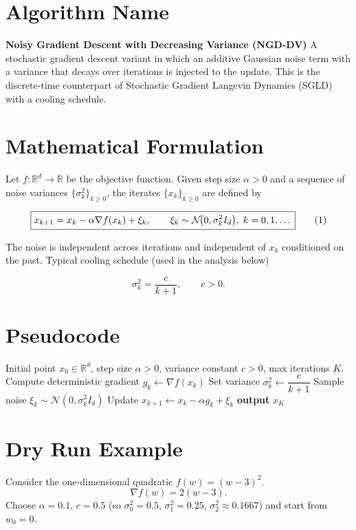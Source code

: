 \documentclass{article}
\begin{document}
\section*{Algorithm Name}
\textbf{Noisy Gradient Descent with Decreasing Variance (NGD-DV)}  
A stochastic gradient descent variant in which an additive Gaussian noise term with a variance that decays over iterations is injected to the update. This is the discrete‑time counterpart of Stochastic Gradient Langevin Dynamics (SGLD) with a cooling schedule.

\section*{Mathematical Formulation}
Let $f:\mathbb{R}^{d}\rightarrow\mathbb{R}$ be the objective function.  
Given step size $\alpha>0$ and a sequence of noise variances $\{\sigma_k^2\}_{k\ge 0}$, the iterates $\{x_k\}_{k\ge 0}$ are defined by  

\[
\boxed{%
x_{k+1}=x_k-\alpha \nabla f(x_k)+\xi_k,\qquad 
\xi_k\sim\mathcal{N}\!\bigl(0,\sigma_k^2 I_d\bigr),\;k=0,1,\dots
}
\tag{1}
\]

The noise is independent across iterations and independent of $x_k$ conditioned on the past.  
Typical cooling schedule (used in the analysis below)  

\[
\sigma_k^2 = \frac{c}{k+1},\qquad c>0.
\tag{2}
\]

\section*{Pseudocode}
\begin{algorithm}[H]
\caption{NGD-DV}
\begin{algorithmic}[1]
\Require Initial point $x_0\in\mathbb{R}^d$, step size $\alpha>0$, variance constant $c>0$, max iterations $K$.
    \State Compute deterministic gradient $g_k \gets \nabla f(x_k)$
    \State Set variance $\sigma_k^2 \gets \dfrac{c}{k+1}$
    \State Sample noise $\xi_k \sim \mathcal{N}(0,\sigma_k^2 I_d)$
    \State Update $x_{k+1} \gets x_k - \alpha g_k + \xi_k$
\EndFor
\State \textbf{output} $x_{K}$
\end{algorithmic}
\end{algorithm}

\section*{Dry Run Example}
Consider the one‑dimensional quadratic $f(w)=(w-3)^2$.  
\[
\nabla f(w)=2(w-3).
\]
Choose $\alpha=0.1$, $c=0.5$ (so $\sigma_0^2=0.5$, $\sigma_1^2=0.25$, $\sigma_2^2\approx0.1667$) and start from $w_0=0$.
\end{document}
